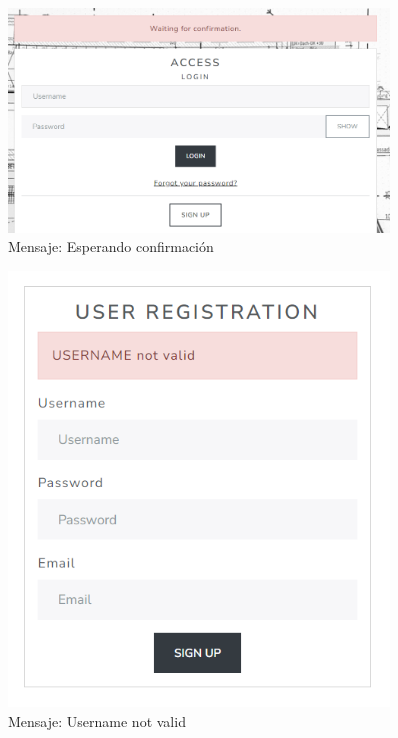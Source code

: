 \documentclass[a4paper, 12pt]{book}
\begin{document}
\begin{itemize}
    \begin{figure}
      \centering
      \includegraphics[width=0.9\textwidth]{img/confacceso.png}
      \caption{Mensaje: Esperando confirmación}
      \label{fig:waiting}
    \end{figure}

    \begin{figure}
      \centering
      \includegraphics[width=0.9\textwidth]{img/username.png}
      \caption{Mensaje: Username not valid}
      \label{fig:usernameerror}
    \end{figure}


\end{itemize}
\end{document}
